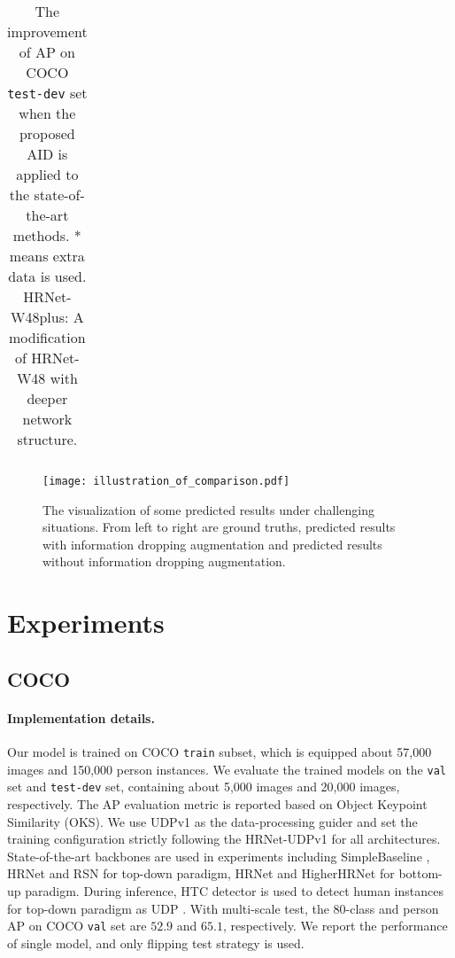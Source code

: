 \documentclass[final]{cvpr}
\begin{document}
\begin{table*}
\begin{center}
\begin{tabular}{l|l|c|lcccccc}
\hline
\end{tabular}
\end{center}
\caption{The improvement of AP on COCO \texttt{test-dev} set when the proposed AID is applied to the state-of-the-art methods. * means extra data is used. HRNet-W48plus: A modification of HRNet-W48 with deeper network structure.}
\label{tab:test-dev}
\end{table*}




\begin{figure*}[htb]
	\setlength{\abovecaptionskip}{0.cm}
    \begin{center}
        \texttt{[image: illustration\_of\_comparison.pdf]}
    \end{center}
   \caption{The visualization of some predicted results under challenging situations. From left to right are ground truths, predicted results with information dropping augmentation and predicted results without information dropping augmentation. }
    \label{fig:illustration}

\end{figure*}






\section{Experiments}
\label{sec:EP}
\subsection{COCO}
\label{sec:coco}
\paragraph{Implementation details.}
Our model is trained on COCO \texttt{train} subset, which is equipped about 57,000 images and 150,000 person instances. We evaluate the trained models on the \texttt{val} set and \texttt{test-dev} set, containing about 5,000 images and 20,000 images, respectively. The AP evaluation metric is reported based on Object Keypoint Similarity (OKS). We use UDPv1 \cite{UDP} as the data-processing guider and set the training configuration strictly following the HRNet-UDPv1 \cite{UDP} for all architectures. State-of-the-art backbones are used in experiments including SimpleBaseline \cite{SBNet}, HRNet \cite{HRNet} and RSN \cite{RSN} for top-down paradigm, HRNet \cite{HRNet} and HigherHRNet \cite{Higher} for bottom-up paradigm. During inference, HTC \cite{HTC} detector is used to detect human instances for top-down paradigm as UDP \cite{UDP}. With multi-scale test, the 80-class and person AP on COCO \texttt{val} set \cite{COCO} are $52.9$ and $65.1$, respectively. We report the performance of single model, and only flipping test strategy is used.
\end{document}
